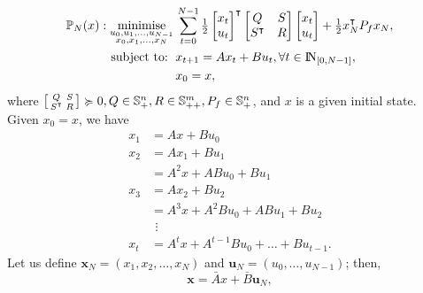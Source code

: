 \documentclass[a4paper,11pt,reqno]{amsart}
\newcommand{\N}{{\rm I\!N}}
\newcommand{\tran}{\intercal}
\DeclareMathOperator*{\minimise}{minimise}
\begin{document}
\begin{subequations}
    \begin{align}
        \mathbb{P}_N(x): \minimise_{\substack{u_0,u_1,\ldots,u_{N-1}\\ x_0,x_1,\ldots,x_N}} \,
         & \sum_{t=0}^{N-1}\textstyle\frac{1}{2}
         \begin{bmatrix}
             x_t\\
             u_t
         \end{bmatrix}^{\tran}
         \begin{bmatrix}
             Q&S\\
             S^{\tran}&R
         \end{bmatrix}
         \begin{bmatrix}
             x_t\\
             u_t
         \end{bmatrix}
         +\frac{1}{2}x_N^{\tran}P_fx_N,
        \\
        \text{subject to: }\,
         & x_{t+1} = A x_t + B u_t, \forall t\in\N_{[0, N-1]},
        \\
         & x_{0} = x,
    \end{align}
\end{subequations}
where $\begin{bsmallmatrix}Q&S\\S^{\tran}&R\end{bsmallmatrix}\succcurlyeq 0, Q\in \mathbb{S}^n_+, R\in \mathbb{S}^m_{++}, P_f\in \mathbb{S}^n_{+}$, and $x$ is a given initial state.
\\
Given $x_{0} = x$, we have
\begin{subequations}
    \begin{align}
        x_1&=Ax+Bu_0
        \\
        x_2&=Ax_1+Bu_1
        \\
        &=A^2x+ABu_0+Bu_1
        \\
        x_3&=Ax_2+Bu_2
        \\
        &=A^3x+A^2Bu_0+ABu_1+Bu_2
        \\
        &\ \, \vdots 
        \\
        x_t&=A^{t}x+A^{t-1}Bu_0+\ldots +Bu_{t-1}.
    \end{align}
\end{subequations}
Let us define $\bm{x}_N = (x_1, x_2,\ldots, x_N)$ and $\bm{u}_N = (u_0,\ldots, u_{N-1})$; then,
\begin{equation}
    \bm{x}=\bar{A}x+\bar{B}\bm{u}_N,
\end{equation}
\end{document}
